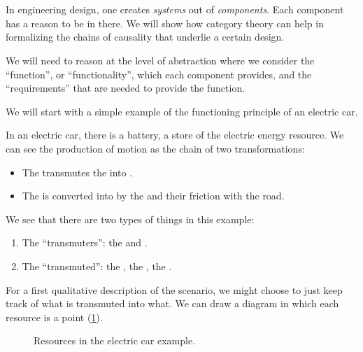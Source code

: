 

\section{}




In engineering design, one creates \emph{systems} out of \emph{components}. Each component has a reason to be in there. We will show how category theory can help in formalizing the chains of causality that underlie a certain design.

We will need to reason at the level of abstraction where we consider the ``function'', or ``functionality'', which each component provides, and the ``requirements'' that are needed to provide the function.

We will start with a simple example of the functioning principle of an electric car.

In an electric car, there is a battery, a store of the electric energy resource. We can see the production of motion as the chain of two transformations:

\begin{itemize}
    \item The \motor transmutes the \electricpower into \rotationalmotion.
    \item The \rotationalmotion is converted into \translationalmotion by the \wheels and their friction with the road.
\end{itemize}

We see that there are two types of things in this example:
\begin{enumerate}
    \item The ``transmuters'': the \motor and \wheels.
    \item The ``transmuted'': the \electricpower, the \rotationalmotion, the \translationalmotion.
\end{enumerate}

For a first qualitative description of the scenario, we might choose to just keep track of what is transmuted into what. We can draw a diagram in which each resource is a point (\cref{fig:e1}).

\begin{figure}[h!]
    \centering
    \caption{Resources in the electric car example.}
    \label{fig:e1}
\end{figure}


